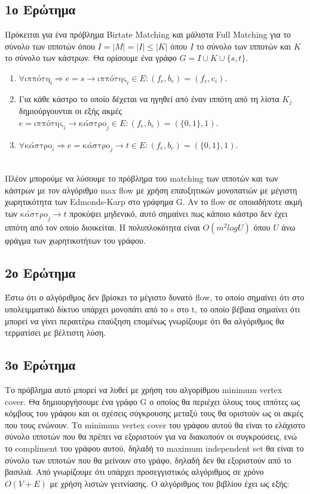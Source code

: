 \documentclass{article}
\begin{document}
\subsection{1ο Ερώτημα}
Πρόκειται για ένα πρόβλημα Birtate Matching και μάλιστα Full Matching για το σύνολο των ιπποτών όπου 
$Ι=|Μ|=|Ι|\le|K|$ όπου $Ι$ το σύνολο των ιπποτών και $Κ$ το σύνολο των κάστρων. Θα ορίσουμε ένα γράφο 
$G = I\cup K\cup \{s,t\}$.\\
\begin{enumerate}
    \item{$\forall \text{ιππότη}_i \Rightarrow e = s \rightarrow \text{ιππότης}_i\in Ε:(f_e,b_e) = (f_e,c_i)$.}
    \item{Για κάθε κάστρο το οποίο δέχεται να ηγηθεί από έναν ιππότη από τη λίστα $K_j$ δημιούργουνται οι 
        εξής ακμές $e = \text{ιππότης}_i \rightarrow \text{κάστρο}_j\in E:(f_e,b_e) = (\{0,1\},1)$.}
    \item{$\forall \text{κάστρο}_i \Rightarrow e = \text{κάστρο}_j \rightarrow t\in Ε:(f_e,b_e) = (\{0,1\},1)$.}
\end{enumerate}\\

Πλέον μπορούμε να λύσουμε το πρόβλημα του matching των ιπποτών και των κάστρων με τον αλγόριθμο max 
flow με χρήση επαυξητικών μονοπατιών με μέγιστη χωρητικότητα των Edmonds-Karp στο γράφημα G. Αν το flow σε οποιαδήποτε ακμή 
των $\text{κάστρο}_j \rightarrow t$ προκύψει μηδενικό, αυτό  σημαίνει πως κάποιο κάστρο δεν έχει ιππότη
από τον οποίο διοικείται. Η πολυπλοκότητα είναι $Ο(m^2logU)$ όπου $U$ άνω φράγμα των χωρητικοτήτων 
του γράφου.\\

\subsection{2ο Ερώτημα}
Έστω ότι ο αλγόριθμος δεν βρίσκει το μέγιστο δυνατό flow, το οποίο σημαίνει ότι στο υπολειμματικό δίκτυο
υπάρχει μονοπάτι από το s στο t, το οποίο βέβαια σημαίνει ότι μπορεί να γίνει περαιτέρω επαύξηση επομένως
γνωρίζουμε ότι θα αλγόριθμος θα τερματίσει με βέλτιστη λύση.\\


\subsection{3ο Ερώτημα}
Το πρόβλημα αυτό μπορεί να λυθεί με χρήση του αλγορίθμου minimum vertex cover. Θα δημιουργήσουμε ένα 
γράφο G ο οποίος θα περιέχει όλους τους ιππότες ως κόμβους του γράφου και οι σχέσεις σύγκρουσης μεταξύ
τους θα οριστούν ως οι ακμές που τους ενώνουν. Το minimum vertex cover του γράφου αυτού θα είναι το
ελάχιστο σύνολο ιπποτών που θα πρέπει να εξοριστούν για να διακοπούν οι συγκρούσεις, ενώ το compliment
του γράφου αυτού, δηλαδή το maximum independent set θα είναι το σύνολο των ιπποτών που θα μείνουν στο
γράφο, δηλαδή δεν θα εξοριστούν από το βασιλιά. Από \cite{CLRS} γνωρίζουμε ότι υπάρχει προσεγγιστικός
αλγόριθμος σε χρόνο $O(V+E)$ με χρήση λιστών γειτνίασης. Ο αλγόριθμος του βιβλίου έχει ως εξής:\\
\end{document}
